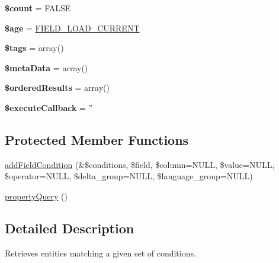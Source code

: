 \begin{DoxyCompactItemize}
\item 
\hypertarget{classEntityFieldQuery_ae08dbba5615ea921ec5a72e42e0824ce}{
{\bfseries \$count} = FALSE}
\label{classEntityFieldQuery_ae08dbba5615ea921ec5a72e42e0824ce}

\item 
\hypertarget{classEntityFieldQuery_aa437a76efdf79e46fe7ac3a4760a1d73}{
{\bfseries \$age} = \hyperlink{group__field_ga39b9fb0d47b181607a4d981a9bccbe8a}{FIELD\_\-LOAD\_\-CURRENT}}
\label{classEntityFieldQuery_aa437a76efdf79e46fe7ac3a4760a1d73}

\item 
\hypertarget{classEntityFieldQuery_a1aa12ecd2effd5dad6ba77803c46c81d}{
{\bfseries \$tags} = array()}
\label{classEntityFieldQuery_a1aa12ecd2effd5dad6ba77803c46c81d}

\item 
\hypertarget{classEntityFieldQuery_a7b2b0567133edfa3afbb37c7ba2b463a}{
{\bfseries \$metaData} = array()}
\label{classEntityFieldQuery_a7b2b0567133edfa3afbb37c7ba2b463a}

\item 
\hypertarget{classEntityFieldQuery_ac6e597534a9aa8b18895e6a26b8e82d0}{
{\bfseries \$orderedResults} = array()}
\label{classEntityFieldQuery_ac6e597534a9aa8b18895e6a26b8e82d0}

\item 
\hypertarget{classEntityFieldQuery_a0a811479c18a4bb1ec5697cd4a1a321b}{
{\bfseries \$executeCallback} = ''}
\label{classEntityFieldQuery_a0a811479c18a4bb1ec5697cd4a1a321b}

\end{DoxyCompactItemize}
\subsection*{Protected Member Functions}
\begin{DoxyCompactItemize}
\item 
\hyperlink{classEntityFieldQuery_addc28605e17a54c0198f3cd6e2753489}{addFieldCondition} (\&\$conditions, \$field, \$column=NULL, \$value=NULL, \$operator=NULL, \$delta\_\-group=NULL, \$language\_\-group=NULL)
\item 
\hyperlink{classEntityFieldQuery_ab3bb269b65934d2aaa0fb2fb3bd884e4}{propertyQuery} ()
\end{DoxyCompactItemize}


\subsection{Detailed Description}
Retrieves entities matching a given set of conditions.

